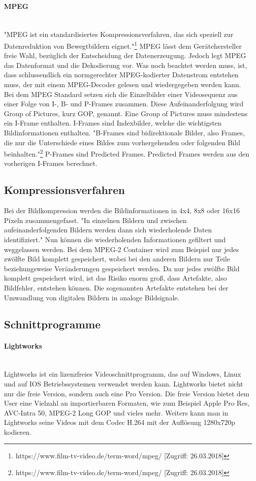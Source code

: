 \paragraph{MPEG}
\leavevmode \\
"MPEG ist ein standardisiertes Kompressionsverfahren, das sich speziell zur Datenreduktion von Bewegtbildern eignet."\footnote{\label{}https://www.film-tv-video.de/term-word/mpeg/ [Zugriff: 26.03.2018]} MPEG lässt dem Gerätehersteller freie Wahl, bezüglich der Entscheidung der Datenerzeugung. Jedoch legt MPEG das Datenformat und die Dekodierung vor. Was noch beachtet werden muss, ist, dass schlussendlich ein normgerechter MPEG-kodierter Datenstrom entstehen muss, der mit einem MPEG-Decoder gelesen und wiedergegeben werden kann. Bei dem MPEG Standard setzen sich die Einzelbilder einer Videosequenz aus einer Folge von I-, B- und P-Frames zusammen. Diese Aufeinanderfolgung wird Group of Pictures, kurz GOP, genannt. Eine Group of Pictures muss mindestens ein I-Frame enthalten. I-Frames sind Indexbilder, welche die wichtigsten Bildinformationen enthalten. "B-Frames sind  bidirektionale Bilder, also Frames, die nur die Unterschiede eines Bildes zum vorhergehenden oder folgenden Bild beinhalten."\footnote{\label{}https://www.film-tv-video.de/term-word/mpeg/ [Zugriff: 26.03.2018]} P-Frames sind Predicted Frames. Predicted Frames werden aus den vorherigen I-Frames berechnet.
\subsection{Kompressionsverfahren}
Bei der Bildkompression werden die Bildinformationen in 4x4, 8x8 oder 16x16 Pixeln zusammengefasst. "In einzelnen Bildern und zwischen aufeinanderfolgenden Bildern werden dann sich wiederholende Daten identifiziert." Nun können die wiederholenden Informationen gefiltert und weggelassen werden. Bei dem MPEG-2 Container wird zum Beispiel nur jedes zwölfte Bild komplett gespeichert, wobei bei den anderen Bildern nur Teile beziehungsweise Veränderungen gespeichert werden. Da nur jedes zwölfte Bild komplett gespeichert wird, ist das Risiko enorm groß, dass Artefakte, also Bildfehler, entstehen können. Die sogenannten Artefakte entstehen bei der Umwandlung von digitalen Bildern in analoge Bildsignale. 
\subsection{Schnittprogramme}
\paragraph{Lightworks}
\leavevmode \\
Lightworks ist ein lizenzfreies Videoschnittprogramm, das auf Windows, Linux und auf IOS Betriebssystemen verwendet werden kann. Lightworks bietet nicht nur die freie Version, sondern auch eine Pro Version. Die freie Version bietet dem User eine Vielzahl an importierbaren Formaten, wie zum Beispiel Apple Pro Res, AVC-Intra 50, MPEG-2 Long GOP und vieles mehr. Weiters kann man in Lightworks seine Videos mit dem Codec H.264 mit der Auflösung 1280x720p kodieren. 

